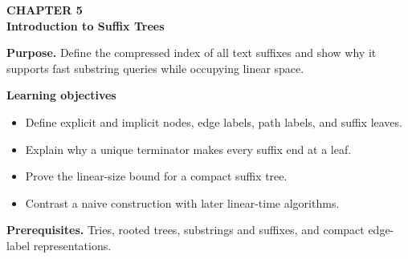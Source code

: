 \documentclass[11pt]{article}
\begin{document}
\begin{tcolorbox}[
  enhanced,breakable,colback=Primary!4,colframe=Primary,boxrule=0.9pt,
  arc=2mm,left=3mm,right=3mm,top=2.5mm,bottom=2.5mm]
{\sffamily\color{Accent}\bfseries CHAPTER 5}\\[-1pt]
{\sffamily\LARGE\bfseries\color{Primary} Introduction to Suffix Trees}

\vspace{2pt}
\textbf{Purpose.} Define the compressed index of all text suffixes and show why it supports fast substring queries while occupying linear space.

\textbf{Learning objectives}
\begin{itemize}
  \item Define explicit and implicit nodes, edge labels, path labels, and suffix leaves.
  \item Explain why a unique terminator makes every suffix end at a leaf.
  \item Prove the linear-size bound for a compact suffix tree.
  \item Contrast a naive construction with later linear-time algorithms.
\end{itemize}

\textbf{Prerequisites.} Tries, rooted trees, substrings and suffixes, and compact edge-label representations.
\end{tcolorbox}
\end{document}
